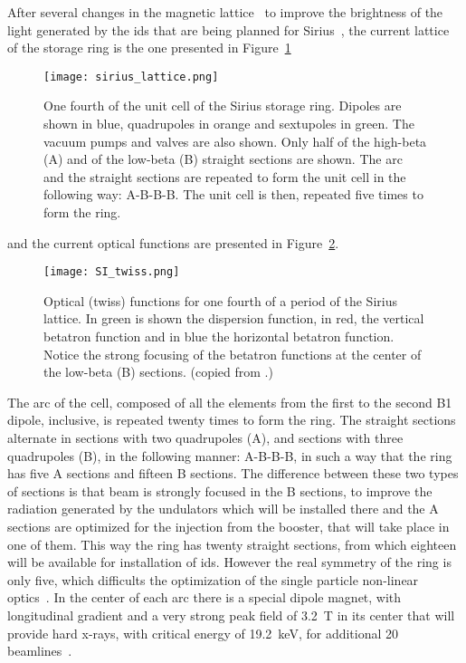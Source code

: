     After several changes in the magnetic lattice~\cite{Liu2014,Liu2015,Liu2016} to improve the brightness of the light generated by the \gls{ids} that are being planned for Sirius~\cite{Sirius2013,Vilela2017}, the current lattice of the storage ring is the one presented in Figure~\ref{fig:sirius_lattice}
    \begin{figure}[h!]
        \center
        \texttt{[image: sirius\_lattice.png]}
        \caption[One fourth of the unit cell of the Sirius storage ring.]{One fourth of the unit cell of the Sirius storage ring. Dipoles are shown in blue, quadrupoles in orange and sextupoles in green. The vacuum pumps and valves are also shown. Only half of the high-beta (A) and of the low-beta (B) straight sections are shown. The arc and the straight sections are repeated to form the unit cell in the following way: A-B-B-B. The unit cell is then, repeated five times to form the ring.}
        \label{fig:sirius_lattice}
    \end{figure}
    and the current optical functions are presented in Figure~\ref{fig:sirius_twiss}.
    \begin{figure}[t!]
        \centering
        \texttt{[image: SI\_twiss.png]}
        \caption[Twiss functions of the Sirius storage ring.]{Optical (twiss) functions for one fourth of a period of the Sirius lattice. In green is shown the dispersion function, in red, the vertical betatron function and in blue the horizontal betatron function. Notice the strong focusing of the betatron functions at the center of the low-beta (B) sections. (copied from .)}
        \label{fig:sirius_twiss}
    \end{figure}
    The arc of the cell, composed of all the elements from the first to the second B1 dipole, inclusive, is repeated twenty times to form the ring. The straight sections alternate in sections with two quadrupoles (A), and sections with three quadrupoles (B), in the following manner: A-B-B-B, in such a way that the ring has five A sections and fifteen B sections. The difference between these two types of sections is that beam is strongly focused in the B sections, to improve the radiation generated by the undulators which will be installed there and the A sections are optimized for the injection from the booster, that will take place in one of them. This way the ring has twenty straight sections, from which eighteen will be available for installation of \gls{ids}. However the real symmetry of the ring is only five, which difficults the optimization of the single particle non-linear optics~\cite{Sa2016, Dester2017}. In the center of each arc there is a special dipole magnet, with longitudinal gradient and a very strong peak field of \SI{3.2}{\tesla} in its center that will provide hard x-rays, with critical energy of \SI{19.2}{\kilo\electronvolt}, for additional 20 beamlines~\cite{Liu2016,Sirius2013}.

